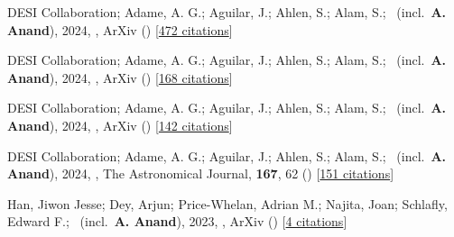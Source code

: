 \item[{\color{numcolor}\scriptsize5}] DESI Collaboration; Adame, A. G.; Aguilar, J.; Ahlen, S.; Alam, S.; \etal\ (incl.\ \textbf{A. Anand}), 2024, , ArXiv () [\href{https://ui.adsabs.harvard.edu/abs/2024arXiv240403002D}{472 citations}]

\item[{\color{numcolor}\scriptsize4}] DESI Collaboration; Adame, A. G.; Aguilar, J.; Ahlen, S.; Alam, S.; \etal\ (incl.\ \textbf{A. Anand}), 2024, , ArXiv () [\href{https://ui.adsabs.harvard.edu/abs/2024arXiv240403000D}{168 citations}]

\item[{\color{numcolor}\scriptsize3}] DESI Collaboration; Adame, A. G.; Aguilar, J.; Ahlen, S.; Alam, S.; \etal\ (incl.\ \textbf{A. Anand}), 2024, , ArXiv () [\href{https://ui.adsabs.harvard.edu/abs/2024arXiv240403001D}{142 citations}]

\item[{\color{numcolor}\scriptsize2}] DESI Collaboration; Adame, A. G.; Aguilar, J.; Ahlen, S.; Alam, S.; \etal\ (incl.\ \textbf{A. Anand}), 2024, , The Astronomical Journal, \textbf{167}, 62 () [\href{https://ui.adsabs.harvard.edu/abs/2024AJ....167...62D}{151 citations}]

\item[{\color{numcolor}\scriptsize1}] Han, Jiwon Jesse; Dey, Arjun; Price-Whelan, Adrian M.; Najita, Joan; Schlafly, Edward F.; \etal\ (incl.\ \textbf{A. Anand}), 2023, , ArXiv () [\href{https://ui.adsabs.harvard.edu/abs/2023arXiv230611784H}{4 citations}]